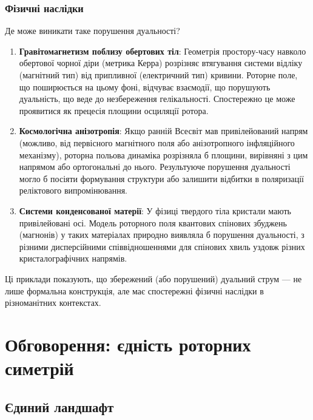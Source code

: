 \documentclass[11pt,a4paper]{article}
\numberwithin{equation}{section}
\theoremstyle{plain}
\theoremstyle{definition}
\theoremstyle{remark}
\begin{document}
\subsubsection{Фізичні наслідки}

Де може виникати таке порушення дуальності?

\begin{enumerate}
  \item \textbf{Гравітомагнетизм поблизу обертових тіл}: Геометрія простору-часу навколо обертової чорної діри (метрика Керра) розрізняє втягування системи відліку (магнітний тип) від припливної (електричний тип) кривини. Роторне поле, що поширюється на цьому фоні, відчуває взаємодії, що порушують дуальність, що веде до незбереження гелікальності. Спостережно це може проявитися як прецесія площини осциляції ротора.

  \item \textbf{Космологічна анізотропія}: Якщо ранній Всесвіт мав привілейований напрям (можливо, від первісного магнітного поля або анізотропного інфляційного механізму), роторна польова динаміка розрізняла б площини, вирівняні з цим напрямом або ортогональні до нього. Результуюче порушення дуальності могло б посіяти формування структури або залишити відбитки в поляризації реліктового випромінювання.

  \item \textbf{Системи конденсованої матерії}: У фізиці твердого тіла кристали мають привілейовані осі. Модель роторного поля квантових спінових збуджень (магнонів) у таких матеріалах природно виявляла б порушення дуальності, з різними дисперсійними співвідношеннями для спінових хвиль уздовж різних кристалографічних напрямів.
\end{enumerate}

Ці приклади показують, що збережений (або порушений) дуальний струм — не лише формальна конструкція, але має спостережні фізичні наслідки в різноманітних контекстах.

\section{Обговорення: єдність роторних симетрій}
\label{sec:discussion}

\subsection{Єдиний ландшафт}
\end{document}
